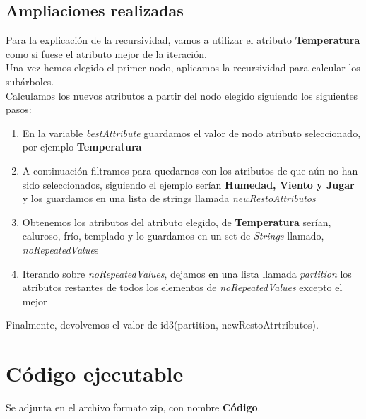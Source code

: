 \documentclass[12pt]{article}
\begin{document}
\subsection{Ampliaciones realizadas}
Para la explicación de la recursividad, vamos a utilizar el atributo \textbf{Temperatura} como si fuese el atributo mejor de la iteración.\\
Una vez hemos elegido el primer nodo, aplicamos la recursividad para calcular los  subárboles.\\
Calculamos los nuevos atributos a partir del nodo elegido siguiendo los siguientes pasos:
\begin{enumerate}
    \item En la variable \textit{bestAttribute} guardamos el valor de nodo atributo seleccionado, por ejemplo \textbf{Temperatura}
    \item A continuación filtramos para quedarnos con los atributos de que aún no han sido seleccionados, siguiendo el ejemplo serían \textbf{Humedad, Viento y Jugar} y los guardamos en una lista de strings llamada \textit{newRestoAttributos}
    \item Obtenemos los atributos del atributo elegido,  de \textbf{Temperatura} serían, caluroso, frío, templado y lo guardamos en un set de \textit{Strings} llamado, \textit{noRepeatedValue}s
    \item Iterando sobre \textit{noRepeatedValues}, dejamos en una lista llamada \textit{partition} los atributos restantes de todos los elementos de \textit{noRepeatedValues} excepto el mejor
\end{enumerate}

Finalmente, devolvemos el valor de id3(partition, newRestoAtrtributos).

\section{Código ejecutable}
Se adjunta en el archivo formato zip, con nombre \textbf{Código}.
\end{document}
